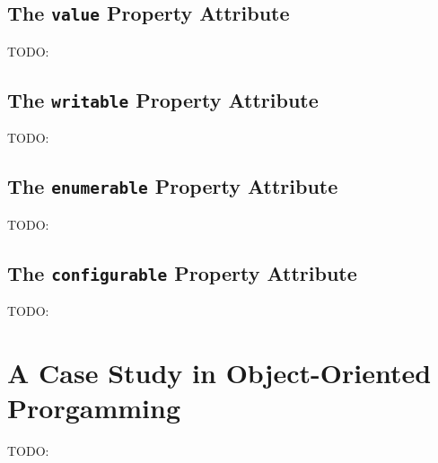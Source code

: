 \documentclass[11pt,letter]{book}
\begin{document}
    \subsection{The \texttt{value} Property Attribute}
    TODO:
    
    \subsection{The \texttt{writable} Property Attribute}
    TODO:
    
    \subsection{The \texttt{enumerable} Property Attribute}
    TODO:
    
    \subsection{The \texttt{configurable} Property Attribute}
    TODO:
    
    \section{A Case Study in Object-Oriented Prorgamming}
    TODO:
    
\end{document}
